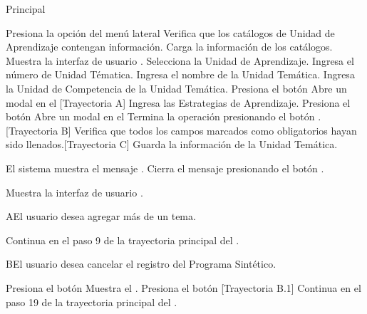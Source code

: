 \begin{UCtrayectoria}{Principal}
    
    \UCpaso[\UCactor] Presiona la opción  del menú lateral
    \UCpaso Verifica que los catálogos de Unidad de Aprendizaje contengan información.
    \UCpaso Carga la información de los catálogos.
    \UCpaso Muestra la interfaz de usuario .
    \UCpaso[\UCactor] Selecciona la Unidad de Aprendizaje.
    \UCpaso[\UCactor] Ingresa el número de Unidad Tématica.
    \UCpaso[\UCactor] Ingresa el nombre de la Unidad Temática.
    \UCpaso[\UCactor] Ingresa la Unidad de Competencia de la Unidad Temática.
    \UCpaso[\UCactor] Presiona el botón 
    \UCpaso Abre un modal en el  [Trayectoria A]
    \UCpaso[\UCactor] Ingresa las Estrategias de Aprendizaje.
    \UCpaso[\UCactor] Presiona el botón 
    \UCpaso Abre un modal en el 
    \UCpaso[\UCactor] Termina la operación presionando el botón . [Trayectoria B]
    \UCpaso Verifica que todos los campos marcados como obligatorios hayan sido llenados.[Trayectoria C]
    \UCpaso Guarda la información de la Unidad Temática.
    
    \UCpaso El sistema muestra el mensaje .
    \UCpaso[\UCactor] Cierra el mensaje presionando el botón . 
    
    
    
    \UCpaso Muestra la interfaz de usuario .
\end{UCtrayectoria}


\begin{UCtrayectoriaA}{A}{El usuario desea agregar más de un tema.}

    \UCpaso Continua en el paso 9 de la trayectoria principal del .
    
\end{UCtrayectoriaA}

\begin{UCtrayectoriaA}{B}{El usuario desea cancelar el registro del Programa Sintético.}

    \UCpaso[\UCactor] Presiona el botón 
    \UCpaso Muestra el .
    \UCpaso[\UCactor] Presiona el botón  [Trayectoria B.1]
    \UCpaso Continua en el paso 19 de la trayectoria principal del .
    
\end{UCtrayectoriaA}


